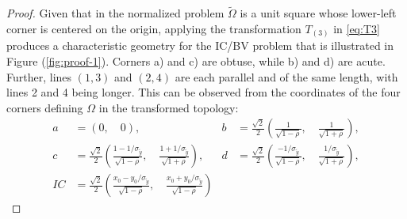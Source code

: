 \begin{proof}
  Given that in the normalized problem $\tilde{\Omega}$ is a unit
  square whose lower-left corner is centered on the origin, applying
  the transformation $T_{(3)}$ in \eqref{eq:T3} produces a
  characteristic geometry for the IC/BV problem that is illustrated in
  Figure (\ref{fig:proof-1}). Corners a) and c) are obtuse, while b)
  and d) are acute. Further, lines $(1,3)$ and $(2, 4)$ are each
  parallel and of the same length, with lines 2 and 4 being
  longer. This can be observed from the coordinates of the four
  corners defining $\Omega$ in the transformed topology:
  \begin{align*}
    a &= (0,\quad 0),&
                       b &= \frac{\sqrt{2}}{2} \left( \frac{1}{\sqrt{1-\rho}},\quad \frac{1}{\sqrt{1+\rho}} \right), \\
    c &= \frac{\sqrt{2}}{2} \left( \frac{1-1/\sigma_{\tilde{y}}}{\sqrt{1-\rho}},\quad \frac{1+1/\sigma_{\tilde{y}}}{\sqrt{1+\rho}} \right),&
                                                                                                                                     d &= \frac{\sqrt{2}}{2} \left( \frac{-1/\sigma_{\tilde{y}}}{\sqrt{1-\rho}},\quad \frac{1/\sigma_{\tilde{y}}}{\sqrt{1+\rho}} \right), \\
    IC &= \frac{\sqrt{2}}{2} \left( \frac{x_0 - y_0/\sigma_{\tilde{y}}}{\sqrt{1-\rho}},\quad \frac{x_0 + y_0/\sigma_{\tilde{y}}}{\sqrt{1-\rho}} \right)
  \end{align*}


\end{proof}
